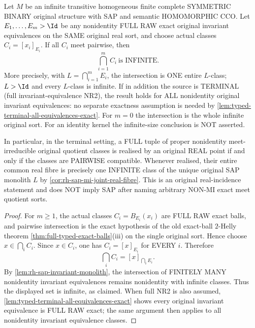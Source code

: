 \begin{corollary}
\label{cor:rh-sap-infinite-exact-helly}
Let $M$ be an infinite transitive homogeneous
finite complete SYMMETRIC BINARY original
structure with SAP and semantic
HOMOMORPHIC CCO. Let
$E_1,\ldots,E_m>\Id$ be any nonidentity
FULL RAW exact original invariant
equivalences on the SAME original
real sort, and choose actual
classes $C_i=[x_i]_{E_i}$.
If all $C_i$ meet pairwise, then
\[
    \boxed{\quad\bigcap_{i=1}^m C_i
                  \ \text{is INFINITE}.\quad}
\]
More precisely, with
$L=\bigcap_{i=1}^m E_i$,
the intersection is ONE entire
$L$-class; $L>\Id$ and every
$L$-class is infinite.
If in addition the source is TERMINAL
(full invariant-equivalence NR2), the
result holds for ALL nonidentity
original invariant equivalences:
no separate exactness assumption is
needed by
\cref{lem:typed-terminal-all-equivalences-exact}.
For $m=0$ the intersection is the
whole infinite original sort.
For an identity kernel the infinite-size
conclusion is NOT asserted.

In particular, in the terminal setting,
a FULL tuple of proper nonidentity
meet-irreducible original quotient
classes is realised by an original
REAL point if and only if the classes
are PAIRWISE compatible. Whenever
realised, their entire common
real fibre is precisely one
INFINITE class of the unique original
SAP monolith $L$ by
\cref{cor:rh-sap-mi-joint-real-fibre}.
This is an original real-incidence
statement and does NOT imply SAP
after naming arbitrary NON-MI
exact meet quotient sorts.
\end{corollary}
\begin{proof}
For $m\ge1$, the actual classes
$C_i=B_{E_i}(x_i)$ are FULL RAW exact
balls, and pairwise intersection is
the exact hypothesis of the old
exact-ball $2$-Helly theorem
\cref{thm:full-typed-exact-balls}(iii)
on the single original sort.
Hence choose $x\in\bigcap_i C_i$.
Since $x\in C_i$, one has
$C_i=[x]_{E_i}$ for EVERY $i$.
Therefore
\[
               \bigcap_i C_i
                    =[x]_{\bigcap_iE_i}.
\]
By \cref{lem:rh-sap-invariant-monolith},
the intersection of FINITELY MANY
nonidentity invariant equivalences
remains nonidentity with infinite
classes. Thus the displayed set
is infinite, as claimed.
When full NR2 is also assumed,
\cref{lem:typed-terminal-all-equivalences-exact}
shows every original invariant
equivalence is FULL RAW exact;
the same argument then applies
to all nonidentity invariant
equivalence classes.
\end{proof}


